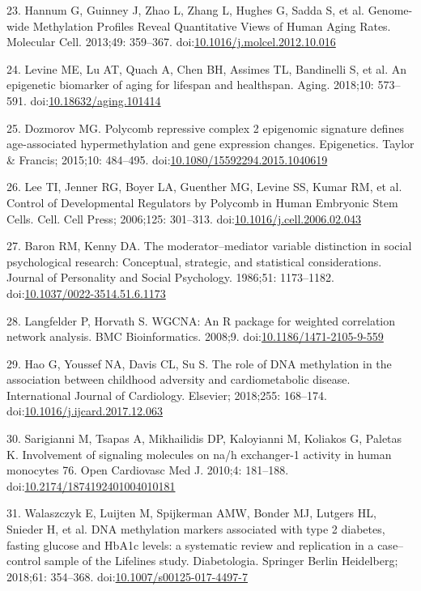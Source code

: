 \documentclass[]{article}
\theoremstyle{definition}
\theoremstyle{definition}
\theoremstyle{definition}
\theoremstyle{remark}
\begin{document}
23. Hannum G, Guinney J, Zhao L, Zhang L, Hughes G, Sadda S, et al.
Genome-wide Methylation Profiles Reveal Quantitative Views of Human
Aging Rates. Molecular Cell. 2013;49: 359--367.
doi:\href{http://dx.doi.org/10.1016/j.molcel.2012.10.016}{10.1016/j.molcel.2012.10.016}

24. Levine ME, Lu AT, Quach A, Chen BH, Assimes TL, Bandinelli S, et al.
An epigenetic biomarker of aging for lifespan and healthspan. Aging.
2018;10: 573--591.
doi:\href{http://dx.doi.org/10.18632/aging.101414}{10.18632/aging.101414}

25. Dozmorov MG. Polycomb repressive complex 2 epigenomic signature
defines age-associated hypermethylation and gene expression changes.
Epigenetics. Taylor \& Francis; 2015;10: 484--495.
doi:\href{http://dx.doi.org/10.1080/15592294.2015.1040619}{10.1080/15592294.2015.1040619}

26. Lee TI, Jenner RG, Boyer LA, Guenther MG, Levine SS, Kumar RM, et
al. Control of Developmental Regulators by Polycomb in Human Embryonic
Stem Cells. Cell. Cell Press; 2006;125: 301--313.
doi:\href{http://dx.doi.org/10.1016/j.cell.2006.02.043}{10.1016/j.cell.2006.02.043}

27. Baron RM, Kenny DA. The moderator--mediator variable distinction in
social psychological research: Conceptual, strategic, and statistical
considerations. Journal of Personality and Social Psychology. 1986;51:
1173--1182.
doi:\href{http://dx.doi.org/10.1037/0022-3514.51.6.1173}{10.1037/0022-3514.51.6.1173}

28. Langfelder P, Horvath S. WGCNA: An R package for weighted
correlation network analysis. BMC Bioinformatics. 2008;9.
doi:\href{http://dx.doi.org/10.1186/1471-2105-9-559}{10.1186/1471-2105-9-559}

29. Hao G, Youssef NA, Davis CL, Su S. The role of DNA methylation in
the association between childhood adversity and cardiometabolic disease.
International Journal of Cardiology. Elsevier; 2018;255: 168--174.
doi:\href{http://dx.doi.org/10.1016/j.ijcard.2017.12.063}{10.1016/j.ijcard.2017.12.063}

30. Sarigianni M, Tsapas A, Mikhailidis DP, Kaloyianni M, Koliakos G,
Paletas K. Involvement of signaling molecules on na/h exchanger-1
activity in human monocytes 76. Open Cardiovasc Med J. 2010;4: 181--188.
doi:\href{http://dx.doi.org/10.2174/1874192401004010181}{10.2174/1874192401004010181}

31. Walaszczyk E, Luijten M, Spijkerman AMW, Bonder MJ, Lutgers HL,
Snieder H, et al. DNA methylation markers associated with type 2
diabetes, fasting glucose and HbA1c levels: a systematic review and
replication in a case--control sample of the Lifelines study.
Diabetologia. Springer Berlin Heidelberg; 2018;61: 354--368.
doi:\href{http://dx.doi.org/10.1007/s00125-017-4497-7}{10.1007/s00125-017-4497-7}
\end{document}

